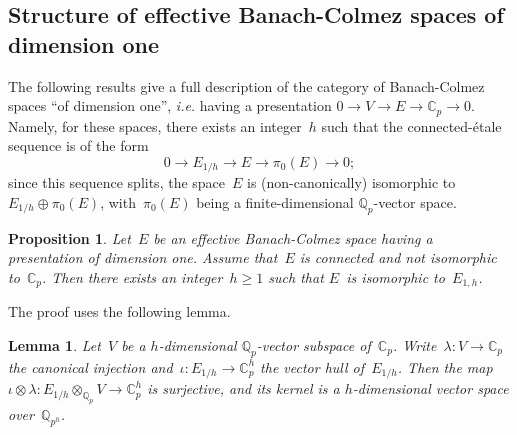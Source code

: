 \documentclass{article}
\newtheorem{prop}[thm]{Proposition}
\newtheorem{lem}[thm]{Lemma}
\theoremstyle{definition}
\def\Qp{{ℚ_p}}
\def\Cp{{ℂ_p}}
\begin{document}
\subsection{Structure of effective Banach-Colmez spaces of dimension one}

The following results give a full description of the category of
Banach-Colmez spaces ``of dimension one'', \emph{i.e.} having a
presentation $0 → V → E → \Cp → 0$. Namely, for these spaces, there
exists an integer~$h$ such that the connected-étale sequence is of the
form
\begin{equation}
0 → E_{1/h} → E → π_0(E) → 0;
\end{equation}
since this sequence splits, the space~$E$ is (non-canonically)
isomorphic to~$E_{1/h} ⊕ π_0(E)$, with~$π_0(E)$ being a
finite-dimensional $\Qp$-vector space.

\begin{prop}\label{prop:structure}
Let~$E$ be an effective Banach-Colmez space having a presentation of
dimension one. Assume that~$E$ is connected and not isomorphic to~$\Cp$.
Then there exists an integer~$h ≥ 1$ such that $E$~is isomorphic
to~$E_{1,h}$.
\end{prop}%

The proof uses the following lemma.
\begin{lem}\label{lem:E1h}
Let~$V$ be a $h$-dimensional $ℚ_p$-vector subspace of~$\Cp$. Write~$λ: V →
\Cp$ the canonical injection and~$ι: E_{1/h} → ℂ_p^h$ the vector hull
of~$E_{1/h}$. Then the map~$ι ⊗ λ: E_{1/h} ⊗_{\Qp} V → ℂ_p^h$ is surjective, and
its kernel is a $h$-dimensional vector space over~$ℚ_{p^h}$.
\end{lem}%
\end{document}
